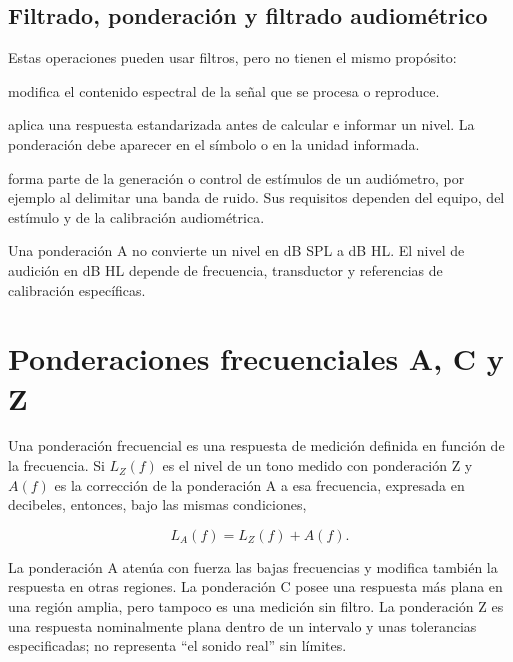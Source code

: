 \subsection{Filtrado, ponderación y filtrado audiométrico}
\label{sec:u5-filtros-ponderacion-audiometria}

Estas operaciones pueden usar filtros, pero no tienen el mismo propósito:

\begin{description}[style=nextline]
    \item[\textbf{Filtrado de una señal:}]
    modifica el contenido espectral de la señal que se procesa o reproduce.

    \item[\textbf{Ponderación frecuencial de una medición:}]
    aplica una respuesta estandarizada antes de calcular e informar un nivel.
    La ponderación debe aparecer en el símbolo o en la unidad informada.

    \item[\textbf{Filtrado audiométrico:}]
    forma parte de la generación o control de estímulos de un audiómetro, por
    ejemplo al delimitar una banda de ruido. Sus requisitos dependen del
    equipo, del estímulo y de la calibración audiométrica.
\end{description}

Una ponderación A no convierte un nivel en dB SPL a dB HL. El nivel de audición
en dB HL depende de frecuencia, transductor y referencias de calibración
específicas.

\section{Ponderaciones frecuenciales A, C y Z}
\label{sec:u5-ponderaciones}

Una ponderación frecuencial es una respuesta de medición definida en función
de la frecuencia. Si \(L_Z(f)\) es el nivel de un tono medido con ponderación
Z y \(A(f)\) es la corrección de la ponderación A a esa frecuencia, expresada
en decibeles, entonces, bajo las mismas condiciones,

\begin{equation}
    L_A(f)=L_Z(f)+A(f).
    \label{eq:u5-correccion-ponderacion}
\end{equation}

La ponderación A atenúa con fuerza las bajas frecuencias y modifica también la
respuesta en otras regiones. La ponderación C posee una respuesta más plana
en una región amplia, pero tampoco es una medición sin filtro. La ponderación
Z es una respuesta nominalmente plana dentro de un intervalo y unas
tolerancias especificadas; no representa ``el sonido real'' sin límites.

